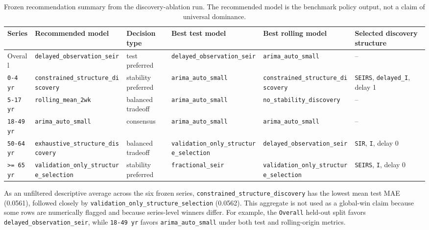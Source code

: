 \begin{table}[H]
\centering
\small
\caption{Frozen recommendation summary from the discovery-ablation run. The
recommended model is the benchmark policy output, not a claim of universal
dominance.}
\label{tab:frozen-recommendations}
\begin{tabularx}{\textwidth}{>{\raggedright\arraybackslash}p{1.35cm}
>{\raggedright\arraybackslash}p{3.1cm}
>{\raggedright\arraybackslash}p{2.25cm}
>{\raggedright\arraybackslash}p{2.8cm}
>{\raggedright\arraybackslash}p{2.8cm}
X}
\toprule
Series & Recommended model & Decision type & Best test model & Best rolling model & Selected discovery structure \\
\midrule
Overall & \texttt{delayed\_observation\_seir} & test preferred &
\texttt{delayed\_observation\_seir} & \texttt{arima\_auto\_small} & -- \\
\texttt{0-4 yr} & \texttt{constrained\_structure\_discovery} &
stability preferred & \texttt{arima\_auto\_small} &
\texttt{constrained\_structure\_discovery} &
\texttt{SEIRS}, \texttt{delayed\_I}, delay 1 \\
\texttt{5-17 yr} & \texttt{rolling\_mean\_2wk} & balanced tradeoff &
\texttt{arima\_auto\_small} & \texttt{no\_stability\_discovery} & -- \\
\texttt{18-49 yr} & \texttt{arima\_auto\_small} & consensus &
\texttt{arima\_auto\_small} & \texttt{arima\_auto\_small} & -- \\
\texttt{50-64 yr} & \texttt{exhaustive\_structure\_discovery} &
balanced tradeoff & \texttt{validation\_only\_structure\_selection} &
\texttt{delayed\_observation\_seir} & \texttt{SIR}, \texttt{I}, delay 0 \\
\texttt{>= 65 yr} & \texttt{validation\_only\_structure\_selection} &
stability preferred & \texttt{fractional\_seir} &
\texttt{validation\_only\_structure\_selection} &
\texttt{SEIRS}, \texttt{I}, delay 0 \\
\bottomrule
\end{tabularx}
\end{table}

As an unfiltered descriptive average across the six frozen series,
\texttt{constrained\_structure\_discovery} has the lowest mean test MAE
(\num{0.0561}), followed closely by
\texttt{validation\_only\_structure\_selection} (\num{0.0562}). This aggregate
is not used as a global-win claim because some rows are numerically flagged
and because series-level winners differ. For example, the \texttt{Overall}
held-out split favors \texttt{delayed\_observation\_seir}, while
\texttt{18-49 yr} favors \texttt{arima\_auto\_small} under both test and
rolling-origin metrics.

